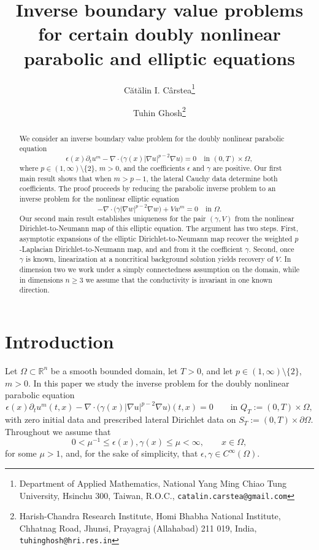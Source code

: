\documentclass[a4paper,12pt]{article}
\title{Inverse boundary value problems for  certain doubly nonlinear parabolic and elliptic equations}
\author{%
C\u{a}t\u{a}lin I. C\^{a}rstea\thanks{
Department of Applied Mathematics,
National Yang Ming Chiao Tung University,
Hsinchu 300, Taiwan, R.O.C.,
\texttt{catalin.carstea@gmail.com}}
\and
Tuhin Ghosh\thanks{
Harish-Chandra Research Institute, Homi Bhabha National Institute,
Chhatnag Road, Jhunsi, Prayagraj (Allahabad) 211 019, India,
\texttt{tuhinghosh@hri.res.in}}}
\date{}
\newcommand{\pr}{\partial}
\newcommand{\R}{\mathbb{R}}
\theoremstyle{definition}
\theoremstyle{remark}
\begin{document}
\maketitle

\begin{abstract}
We consider an inverse boundary value problem for the doubly nonlinear parabolic equation
\[
\epsilon(x)\pr_t u^m-\nabla\cdot\bigl(\gamma(x)|\nabla u|^{p-2}\nabla u\bigr)=0
\quad\text{in }(0,T)\times\Omega,
\]
where $p\in(1,\infty)\setminus\{2\}$, $m>0$, and the coefficients $\epsilon$ and $\gamma$ are positive. Our first main result shows that when $m>p-1$, the lateral Cauchy data determine both coefficients. The proof proceeds by reducing the parabolic inverse problem to an inverse problem for the nonlinear elliptic equation
\[
-\nabla\cdot\bigl(\gamma|\nabla w|^{p-2}\nabla w\bigr)+Vw^m=0
\quad\text{in }\Omega.
\]
Our second main result establishes uniqueness for the pair $(\gamma,V)$ from the nonlinear Dirichlet-to-Neumann map of this elliptic equation. The argument has two steps. First, asymptotic expansions of the elliptic Dirichlet-to-Neumann map recover the weighted $p$-Laplacian Dirichlet-to-Neumann map, and and from it the coefficient $\gamma$. Second, once $\gamma$ is known, linearization at a noncritical background solution yields recovery of $V$. In dimension two we work under a simply connectedness assumption on the domain, while in dimensions $n\ge 3$ we assume that the conductivity is invariant in one known direction.
\end{abstract}

\section{Introduction}

Let $\Omega\subset\R^n$ be a smooth bounded domain, let $T>0$, and let $p\in(1,\infty)\setminus\{2\}$, $m>0$. In this paper we study the inverse problem for the doubly nonlinear parabolic equation
\begin{equation}\label{eq:parabolic}
\epsilon(x)\pr_t u^m(t,x)-\nabla\cdot\bigl(\gamma(x)|\nabla u|^{p-2}\nabla u\bigr)(t,x)=0
\qquad \text{in }Q_T:=(0,T)\times\Omega,
\end{equation}
with zero initial data and prescribed lateral Dirichlet data on $S_T:=(0,T)\times\pr\Omega$. Throughout we assume that
\begin{equation}\label{eq:coeff-bounds}
0<\mu^{-1}\le \epsilon(x),\gamma(x)\le \mu<\infty,
\qquad x\in\Omega,
\end{equation}
for some $\mu>1$, and, for the sake of simplicity, that $\epsilon,\gamma\in C^\infty(\Omega)$. 
\end{document}
